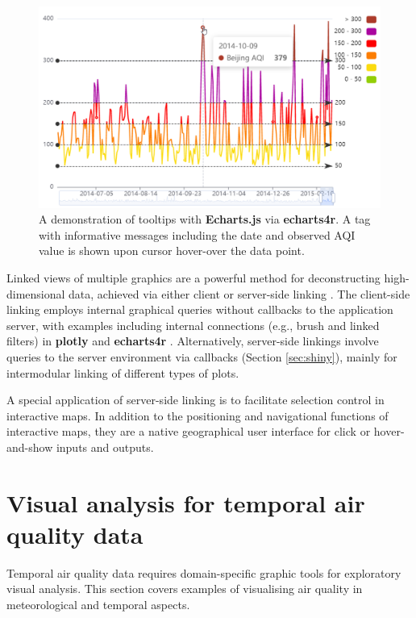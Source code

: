 \documentclass{aucklandthesis}
\begin{document}
\begin{figure}
\includegraphics[width=1\linewidth]{figures/tt-demo} \caption{A demonstration of tooltips with \textbf{Echarts.js} via \textbf{echarts4r}. A tag with informative messages including the date and observed AQI value is shown upon cursor hover-over the data point.}\label{fig:tt-demo}
\end{figure}



Linked views of multiple graphics are a powerful method for deconstructing high-dimensional data, achieved via either client or server-side linking \autocite{plotly}. The client-side linking employs internal graphical queries without callbacks to the application server, with examples including internal connections (e.g., brush and linked filters) in \textbf{plotly} \autocite{plotly} and \textbf{echarts4r} \autocite{echarts4r}. Alternatively, server-side linkings involve queries to the server environment via callbacks (Section \ref{sec:shiny}), mainly for intermodular linking of different types of plots.

A special application of server-side linking is to facilitate selection control in interactive maps. In addition to the positioning and navigational functions of interactive maps, they are a native geographical user interface for click or hover-and-show inputs and outputs.

\hypertarget{visual-analysis-for-temporal-air-quality-data}{%
\section{Visual analysis for temporal air quality data}\label{visual-analysis-for-temporal-air-quality-data}}

Temporal air quality data requires domain-specific graphic tools for exploratory visual analysis. This section covers examples of visualising air quality in meteorological and temporal aspects.
\end{document}
